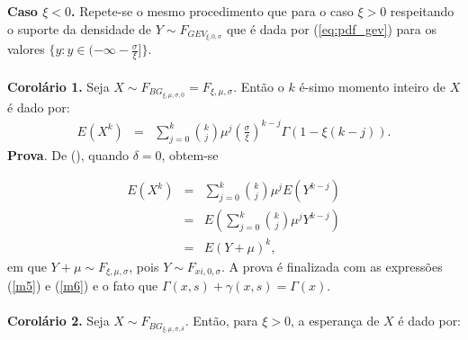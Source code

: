 \documentclass[pdftex,11pt]{article}%
\numberwithin{equation}{section} %
\begin{document}
	
	\textbf{Caso $\xi<0$.} Repete-se o mesmo procedimento que para o caso $\xi>0$  respeitando o suporte da densidade de  $Y\sim F_{GEV_{\xi, 0, \sigma}}$ que é dada por (\ref{eq:pdf_gev}) para os valores $\{y: y\in (-\infty -\frac{\sigma}{\xi}]\}$.
\\
\vspace{1cm}\\
\textbf{Corolário 1.} 
Seja $X\sim F_{BG_{\xi,\mu,\sigma, 0}}=F_{\xi,\mu,\sigma}$. Então o $k$ é-simo  momento inteiro  de $X$ é  dado por:
\begin{eqnarray}
E(X^k)&=& \sum_{j=0}^{k} \binom{k}{j} \mu^{j} \left( \frac{\sigma}{\xi}\right)^{k-j}\Gamma(1-\xi (k-j)).
\end{eqnarray}
\textbf{Prova}. De (), quando $\delta=0$, obtem-se

\begin{eqnarray}
 	E(X^k)&=&  \sum_{j=0}^{k} \binom{k}{j} \mu^{j} E\left(Y^{k-j}\right) \nonumber\\
 	      &=& E\left(\sum_{j=0}^{k} \binom{k}{j} \mu^{j} Y^{k-j}\right) \nonumber\\
 	      &=& E(Y+\mu )^k,
\end{eqnarray}
em que $Y+\mu \sim F_{\xi, \mu, \sigma}$, pois $Y\sim F_{xi, 0, \sigma}$. A prova é finalizada com as expressões (\ref{m5}) e (\ref{m6}) e o fato que $\Gamma(x,s)+\gamma(x,s)=\Gamma(x)$.	
\\
\vspace{1cm}\\
\textbf{Corolário 2.}  
Seja $X\sim F_{BG_{\xi,\mu,\sigma, \delta}}$. Então, para $\xi>0$, a esperança de  $X$ é  dado por:
\end{document}
